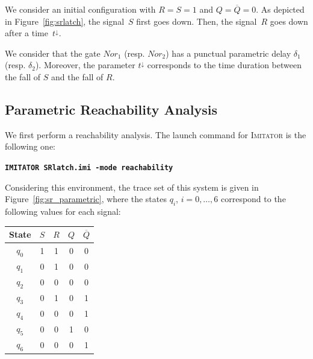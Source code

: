 \documentclass[a4paper,11pt]{article}
\newcommand{\imitator}{\textsc{Imitator}}
\newcommand{\imitatorExec}{\code{IMITATOR}}
\newcommand{\code}[1]{\textbf{\texttt{#1}}}
\begin{document}
We consider an initial configuration with $R = S = 1$ and $Q = \overline{Q} = 0$.
As depicted in Figure~\ref{fig:srlatch}, the signal~$S$ first goes down.
Then, the signal~$R$ goes down after a time~$t^\downarrow$.


We consider that the gate $\mathit{Nor}_1$ (resp. $\mathit{Nor}_2$) has a punctual parametric delay $\delta_1$ (resp. $\delta_2$).
Moreover, the parameter $t^\downarrow$ corresponds to the time duration between the fall of $S$ and the fall of $R$.


\subsection{Parametric Reachability Analysis}

We first perform a reachability analysis.
The launch command for \imitator{} is the following one:

\code{\imitatorExec{} SRlatch.imi -mode reachability}

Considering this environment, the trace set of this system is given in Figure~\ref{fig:sr_parametric}, where the states $q_i$, $i = 0, \dots, 6$ correspond to the following values for each signal:

\smallskip

{

\centering

\begin{tabular}{|c||c|c|c|c|}
	\hline
	State & $S$ & $R$ & $Q$ & $\overline{Q}$ \\
	\hline
	$q_0$ & 1 & 1 & 0 & 0 \\
	\hline
	$q_1$ & 0 & 1 & 0 & 0 \\
	\hline
	$q_2$ & 0 & 0 & 0 & 0 \\
	\hline
	$q_3$ & 0 & 1 & 0 & 1 \\
	\hline
	$q_4$ & 0 & 0 & 0 & 1 \\
	\hline
	$q_5$ & 0 & 0 & 1 & 0 \\
	\hline
	$q_6$ & 0 & 0 & 0 & 1 \\
	\hline
\end{tabular}

}

\medskip
\end{document}
